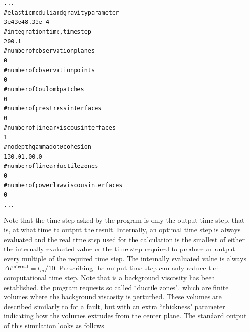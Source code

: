 \documentclass[10pt]{article}
\begin{document}
\begin{alltt}
...
# elastic moduli and gravity parameter
3e4 3e4 8.33e-4
# integration time, time step
{\color{orange}20 0.1}
# number of observation planes
0
# number of observation points
0
# number of Coulomb patches
0
# number of prestress interfaces
0
# number of linear viscous interfaces
{\color{orange}1}
# no depth gammadot0 cohesion
{\color{orange}   1  30.0       1.0      0.0}
# number of linear ductile zones
{\color{orange}0}
# number of powerlaw viscous interfaces
0
...
\end{alltt}
Note that the time step asked by the program is only the output time step, that is, at what time to output the result. Internally, an optimal time step is always evaluated and the real time step used for the calculation is the smallest of either the internally evaluated value or the time step required to produce an output every multiple of the required time step. The internally evaluated value is always $\Delta t^{\text{internal}}=t_m/10$. Prescribing the output time step can only reduce the computational time step. Note that is a background viscosity has been established, the program requests so called ``ductile zones", which are finite volumes where the background viscosity is perturbed. These volumes are described similarly to for a fault, but with an extra ``thickness" parameter indicating how the volumes extrudes from the center plane. The standard output of this simulation looks as follows
\end{document}
